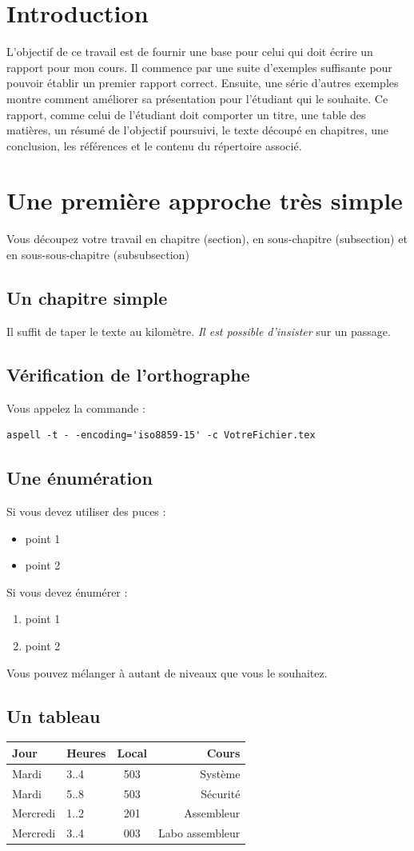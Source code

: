 \section{Introduction}
L'objectif de ce travail est de fournir une base pour celui qui doit écrire un rapport pour mon cours. Il commence par une suite d'exemples suffisante pour pouvoir établir un premier rapport correct. Ensuite, une série d'autres exemples montre comment améliorer sa présentation pour l'étudiant qui le souhaite. Ce rapport, comme celui de l'étudiant doit comporter un titre, une table des matières, un résumé de l'objectif poursuivi, le texte découpé en chapitres, une conclusion, les références et le contenu du répertoire associé.  
\section {Une première approche très simple}
Vous découpez votre travail en chapitre (section), en sous-chapitre (subsection) et en sous-sous-chapitre (subsubsection)
\subsection {Un chapitre simple}
Il suffit de taper le texte au kilomètre. \emph{Il est possible d'insister} sur un passage.
\subsection {Vérification de l'orthographe}
Vous appelez la commande :
\lstset{frame=trBL}
\begin{lstlisting}
aspell -t - -encoding='iso8859-15' -c VotreFichier.tex
\end{lstlisting}
\subsection {Une énumération}
Si vous devez utiliser des puces :
\begin{itemize}
\item point 1
\item point 2
\end{itemize}
Si vous devez énumérer :
\begin{enumerate}
\item point 1
\item point 2
\end{enumerate}
Vous pouvez mélanger à autant de niveaux que vous le souhaitez.
\subsection{Un tableau}
\begin{tabular}{|l|l||c||r|} %
\hline
Jour & Heures & Local & Cours \\
\hline
Mardi    &  3..4  & 503 & Système\\
Mardi    &  5..8  & 503 & Sécurité\\
\hline
Mercredi  &  1..2  &  201 & Assembleur\\
Mercredi  &  3..4  &  003 & Labo assembleur\\
\hline
\end{tabular}

